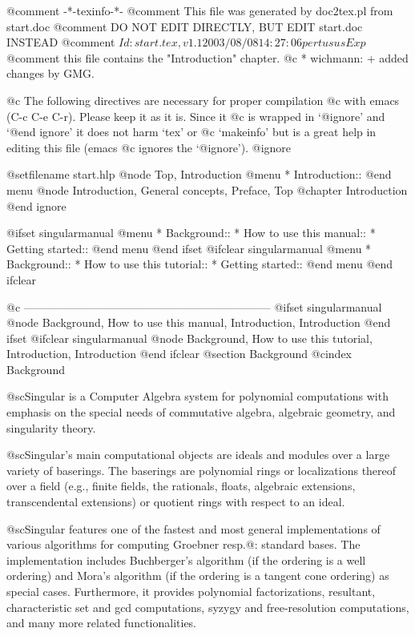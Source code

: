 @comment -*-texinfo-*-
@comment This file was generated by doc2tex.pl from start.doc
@comment DO NOT EDIT DIRECTLY, BUT EDIT start.doc INSTEAD
@comment $Id: start.tex,v 1.1 2003/08/08 14:27:06 pertusus Exp $
@comment this file contains the "Introduction" chapter.
@c * wichmann: + added changes by GMG.

@c The following directives are necessary for proper compilation
@c with emacs (C-c C-e C-r).  Please keep it as it is.  Since it
@c is wrapped in `@ignore' and `@end ignore' it does not harm `tex' or
@c `makeinfo' but is a great help in editing this file (emacs
@c ignores the `@ignore').
@ignore

@setfilename start.hlp
@node Top, Introduction
@menu
* Introduction::
@end menu
@node Introduction, General concepts, Preface, Top
@chapter Introduction
@end ignore


@ifset singularmanual
@menu
* Background::
* How to use this manual::
* Getting started::
@end menu
@end ifset
@ifclear singularmanual
@menu
* Background::
* How to use this tutorial::
* Getting started::
@end menu
@end ifclear

@c ------------------------------------------------------------------
@ifset singularmanual
@node Background, How to use this manual, Introduction, Introduction
@end ifset
@ifclear singularmanual
@node Background, How to use this tutorial, Introduction, Introduction
@end ifclear
@section Background
@cindex Background

@sc{Singular} is a Computer Algebra system for polynomial
computations with emphasis on the special needs of commutative
algebra, algebraic geometry, and singularity theory.

@sc{Singular}'s main computational objects are ideals and
modules over a large variety of baserings. The baserings are polynomial
rings or localizations thereof over a field (e.g., finite fields, the
rationals, floats, algebraic extensions, transcendental extensions) or
quotient rings with respect to an ideal.

@sc{Singular} features one of the fastest and most general
implementations of various algorithms for computing Groebner
resp.@: standard bases. The implementation includes Buchberger's algorithm
(if the ordering is a well ordering) and Mora's algorithm (if the
ordering is a tangent cone ordering) as special cases.  Furthermore, it
provides polynomial factorizations, resultant, characteristic set and
gcd computations, syzygy and free-resolution computations, and many more
related functionalities.

